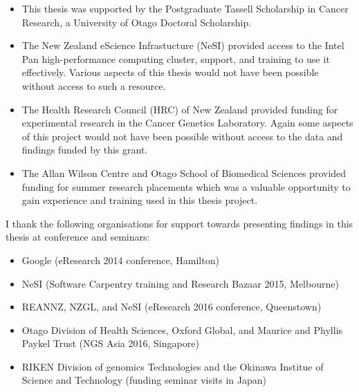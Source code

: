 \begin{small}
 
\begin{itemize}
\item
This thesis was supported by the Postgraduate Tassell Scholarship in Cancer Research, a University of Otago Doctoral Scholarship.

\item
The New Zealand eScience Infrastucture (NeSI) provided access to the Intel Pan high-performance computing cluster, support, and training to use it effectively. Various aspects of this thesis would not have been possible without access to such a resource. 

\item
The Health Research Council (HRC) of New Zealand provided funding for experimental research in the Cancer Genetics Laboratory. Again some aspects of this project would not have been possible without access to the data and findings funded by this grant.

\item
The Allan Wilson Centre and Otago School of Biomedical Sciences provided funding for summer research placements which was a valuable opportunity to gain experience and training used in this thesis project.

\end{itemize}

\end{small}


I thank the following organisations for support towards presenting findings in this thesis at conference and seminars:

\begin{small}

\begin{itemize}

\item
Google (eResearch 2014 conference, Hamilton)

\item
NeSI (Software Carpentry training and Research Bazaar 2015, Melbourne)

\item
REANNZ, NZGL, and NeSI (eResearch 2016 conference, Queenstown)

\item
Otago Division of Health Sciences, Oxford Global, and Maurice and Phyllis Paykel Trust (NGS Asia 2016, Singapore)

\item
RIKEN Division of \Glspl{genomic} Technologies and the Okinawa Institue of Science and Technology (funding seminar visits in Japan)

\end{itemize}

\end{small}

